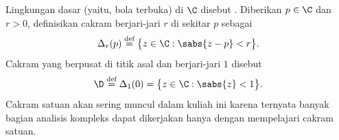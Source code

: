 
Lingkungan dasar (yaitu, bola terbuka) di $\C$
disebut \emph{}.
Diberikan $p \in \C$ dan $r > 0$, definisikan cakram berjari-jari $r$ di
sekitar $p$ sebagai
%
\begin{equation*}
\Delta_r(p)
\overset{\text{def}}{=}
\bigl\{ z \in \C : \sabs{z-p} < r \bigr\} .
\end{equation*}
Cakram yang berpusat di titik asal dan berjari-jari $1$ disebut
\emph{}
%
\begin{equation*}
\D
\overset{\text{def}}{=}
\Delta_1(0)
=
\bigl\{ z \in \C : \sabs{z} < 1 \bigr\} .
\end{equation*}
Cakram satuan akan sering muncul dalam kuliah ini karena ternyata banyak
bagian analisis kompleks dapat dikerjakan hanya dengan mempelajari cakram
satuan.
